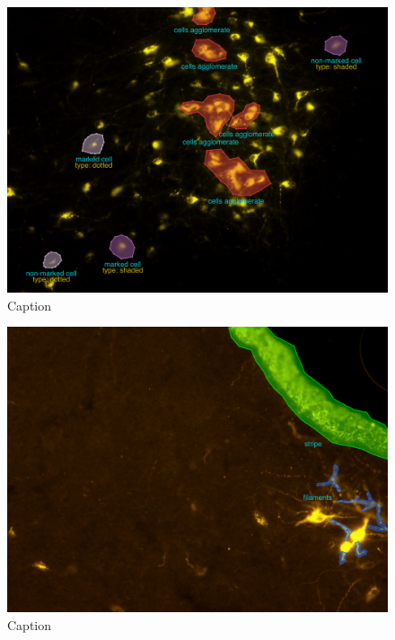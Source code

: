 \begin{landscape}
\begin{figure}
    \centering
    \includegraphics[width=\linewidth]{figures/120_dataset/challenges/challenges.pdf}
    \caption{Caption}
    \label{fig:artifacts:clumping}
\end{figure}
\end{landscape}

\begin{landscape}
\begin{figure}
    \centering
    \includegraphics[width=\linewidth]{figures/120_dataset/challenges/stripe_and_filaments.pdf}
    \caption{Caption}
    \label{fig:artifacts:stripe}
\end{figure}
\end{landscape}

